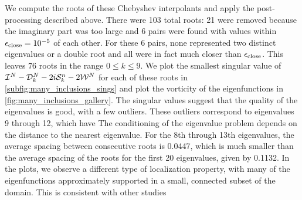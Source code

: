 We compute the roots of these Chebyshev interpolants
and apply the post-processing described above.
%
There were 103 total roots: 21 were removed because
the imaginary part was too large and 6 pairs were found
with values within ${\epsilon_{\textrm{close}}} = 10^{-5}$ of each other.
%
For these 6 pairs, none represented two distinct
eigenvalues or a double root and all were in fact
much closer than ${\epsilon_{\textrm{close}}}$.
%
This leaves 76 roots in the range $0\leq k \leq 9$.
%
We plot the smallest singular value of
$\mathcal I^N-{\mathcal D}_{k}^N-2i{\mathcal S}_k^n-2{\mathcal W}^N$ for each of these roots in
\cref{subfig:many_inclusions_sings}
and plot the vorticity of the eigenfunctions
in \cref{fig:many_inclusions_gallery}.
%
The singular values suggest that the quality of the
eigenvalues is good, with a few outliers.
%
These outliers correspond to eigenvalues 9 through 12,
which have 
The conditioning of the eigenvalue problem depends
on the distance to the nearest eigenvalue. For
the 8th through 13th eigenvalues, the average
spacing between consecutive roots is 0.0447,
which is much smaller than the average spacing of
the roots for the first 20 eigenvalues, given by
0.1132.
In the plots, we observe a different type of
localization property, with many of the eigenfunctions
approximately supported in a small, connected subset
of the domain. This is consistent with other studies

%
